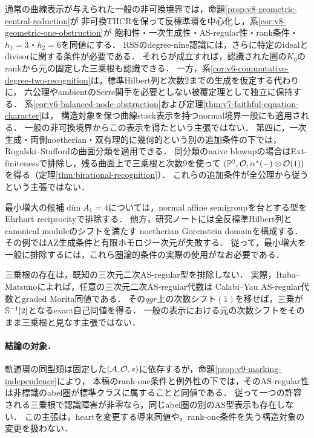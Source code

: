 \documentclass[11pt,a4paper]{ltjsarticle}
\begin{document}
通常の曲線表示が与えられた一般の非可換境界では，命題\ref{prop:v8-geometric-central-reduction}が
非可換THCRを保って反標準環を中心化し，系\ref{cor:v8-geometric-one-obstruction}が
飽和性・一次生成性・AS-regular性・rank条件・$h_1=3$・$h_2=6$を同値にする．
RSS\cite[Notation 3.2, Theorem 4.3]{RSS}のdegree-nine認識には，さらに特定のidealとdivisorに関する条件が必要である．
それらが成立すれば，認識された圏の$K_0$のrankから元の固定した三乗根も認識できる．
一方，系\ref{cor:v6-commutative-degree-two-recognition}は，標準Hilbert列と次数$2$までの生成を仮定する代わりに，
六公理やambientのSerre関手を必要としない被覆定理として独立に保持する．
系\ref{cor:v6-balanced-node-obstruction}および定理\ref{thm:v7-faithful-equation-character}は，
構造対象を保つ曲線stack表示を持つnormal境界一般にも適用される．
一般の非可換境界からこの表示を得たという主張ではない．
第四に，一次生成・両側noetherian・双有理的に幾何的という別の追加条件の下では，
Rogalski--Stafford\cite[Theorem 1.1, Corollary 1.2]{RSsurface}の曲面分類を適用できる．
同分類のnaive blowupの場合はExt-finitenessで排除し，残る曲面上で三乗根と次数9を使って
$(\mathbb P^2,\mathcal O,\alpha^*(-)\otimes\mathcal O(1))$を得る（定理\ref{thm:birational-recognition}）．
これらの追加条件が全公理から従うという主張ではない．

最小増大の候補$\dim A_1=4$については，normal affine semigroupを台とする型を
Ehrhart reciprocity\cite{StanleyReciprocity,BeckDevelin}で排除する．
他方，研究ノートには全反標準Hilbert列とcanonical moduleのシフトを満たす
noetherian Gorenstein domainを構成する．その例ではAZ生成条件と有限ホモロジー次元が失敗する．
従って，最小増大を一般に排除するには，これら圏論的条件の実際の使用がなお必要である．

三乗根の存在は，既知の三次元二次AS-regular型を排除しない．
実際，Itaba--Matsuno\cite[Theorems 1.1, 4.4]{IM}によれば，任意の三次元二次AS-regular代数は
Calabi--Yau AS-regular代数とgraded Morita同値である．
その$qgr$上の次数シフト$(1)$を移せば，三乗が$\mathbb S^{-1}[2]$となるexact自己同値を得る．
一般の表示における元の次数シフトをそのまま三乗根と見なす主張ではない．

\paragraph{結論の対象．}
軌道環の同型類は固定した$(\mathcal A,\mathcal O,s)$に依存するが，命題\ref{prop:v9-marking-independence}により，
本稿のrank-one条件と例外性の下では，そのAS-regular性は非標識のabel圏が標準クラスに属することと同値である．
従って一つの許容される三乗根で認識障害が非零なら，同じabel圏の別のAS型表示も存在しない．
この主張は，heartを変更する導来同値や，rank-one条件を失う構造対象の変更を扱わない．
\end{document}
